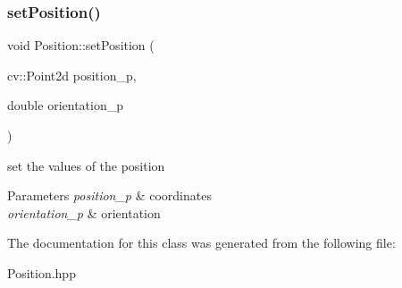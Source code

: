 \subsubsection{\texorpdfstring{set\+Position()}{setPosition()}}
{\footnotesize\ttfamily void Position\+::set\+Position (\begin{DoxyParamCaption}\item[{cv\+::\+Point2d}]{position\+\_\+p,  }\item[{double}]{orientation\+\_\+p }\end{DoxyParamCaption})}



set the values of the position 


\begin{DoxyParams}{Parameters}
{\em position\+\_\+p} & coordinates \\
\hline
{\em orientation\+\_\+p} & orientation \\
\hline
\end{DoxyParams}


The documentation for this class was generated from the following file\+:\begin{DoxyCompactItemize}
\item 
Position.\+hpp\end{DoxyCompactItemize}
